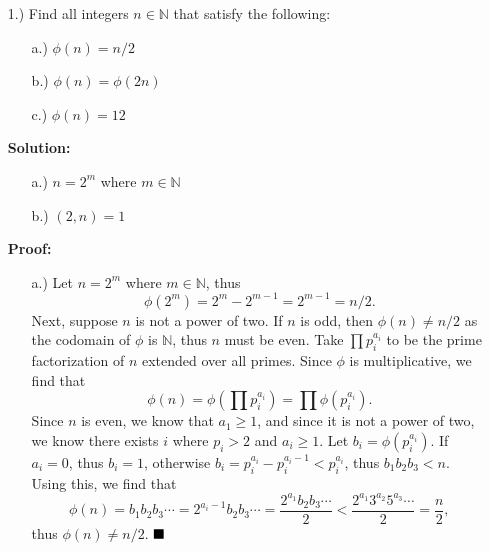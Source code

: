 \documentclass[12pt]{article}
\newcommand{\parens}[1]{\left( #1 \right)}
\newcommand{\N}{\mathbb{N}}
\newcommand{\solution}{\textbf{Solution:}}
\newcommand{\proof}{\textbf{Proof:}}
\newcommand{\done}{\ensuremath{
    \strut\hfill\blacksquare
}}
\begin{document}
    \pagestyle{fancy}

    \begin{itemize}
        \item[1.)] Find all integers \( n \in \N \) that satisfy the following:
        \begin{itemize}
            \item [a.)] \( \phi(n) = n / 2 \)
            \item [b.)] \( \phi(n) = \phi(2n) \)
            \item [c.)] \( \phi(n) = 12 \)
        \end{itemize}

        \solution

        \begin{itemize}
            \item [a.)] \( n = 2^m \) where \( m \in \N \)

            \item [b.)] \( (2, n) = 1 \)
        \end{itemize}

        \proof

        \begin{itemize}
            \item [a.)] Let \( n = 2^m \) where \( m \in \N \), thus
            \[
                \phi(2^m)
                = 2^m - 2^{m - 1}
                = 2^{m - 1}
                = n / 2
                .
            \]
            Next, suppose \( n \) is not a power of two.
            If \( n \) is odd, then \( \phi(n) \ne n / 2 \) as the codomain
            of \( \phi \) is \( \N \), thus \( n \) must be even.
            Take \( \prod p_i^{a_i} \) to be the prime factorization of
            \( n \) extended over all primes.
            Since \( \phi \) is multiplicative, we find that
            \[
                \phi(n)
                = \phi \parens{\prod p_i^{a_i}}
                = \prod \phi(p_i^{a_i})
                .
            \]
            Since \( n \) is even, we know that \( a_1 \geq 1 \), and since it
            is not a power of two, we know there exists \( i \) where
            \( p_i > 2 \) and \( a_i \geq 1 \).
            Let \( b_i = \phi(p_i^{a_i}) \). If \( a_i = 0 \), thus
            \( b_i = 1 \), otherwise
            \( b_i = p_i^{a_i} - p_i^{a_i - 1} < p_i^{a_i} \), thus
            \( b_1b_2b_3 < n \).
            Using this, we find that
            \[
                \phi(n) = b_1 b_2 b_3 \cdots
                = 2^{a_i - 1} b_2 b_3 \cdots
                = \frac{2^{a_1} b_2 b_3 \cdots}{2}
                < \frac{2^{a_1} 3^{a_2} 5^{a_3} \cdots}{2}
                = \frac{n}{2}
                ,
            \]
            thus \( \phi(n) \ne n / 2 \).
            \done


\end{itemize}
\end{itemize}
\end{document}
